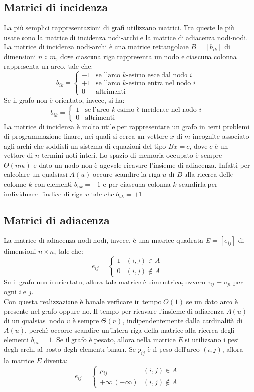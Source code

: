 \documentclass[12pt]{report}
\begin{document}
   	\subsection{Matrici di incidenza}
   	La più semplici rappresentazioni di grafi utilizzano matrici. Tra queste le più usate sono la matrice di incidenza nodi-archi e la matrice di adiacenza nodi-nodi. La matrice di incidenza nodi-archi è una matrice rettangolare $B = [b_{ik}]$ di dimensioni $n \times m$, dove ciascuna riga rappresenta un nodo e ciascuna colonna rappresenta un arco, tale che:
   	\[
   	b_{ik} = \begin{cases}
   		-1 & \text{se l'arco $k$-esimo esce dal nodo $i$} \\
   		+1 & \text{se l'arco $k$-esimo entra nel nodo $i$} \\
   		0 & \text{altrimenti}
   	\end{cases}
   	\]
   	Se il grafo non è orientato, invece, si ha:
   	\[
   	b_{ik} = \begin{cases}
   		1 & \text{se l'arco $k$-esimo è incidente nel nodo $i$} \\
   		0 & \text{altrimenti}
   	\end{cases}
   	\]
   	La matrice di incidenza è molto utile per rappresentare un grafo in certi problemi di programmazione linare, nei quali si cerca un vettore $x$ di $m$ incognite associato agli archi che soddisfi un sistema di equazioni del tipo $Bx = c$, dove $c$ è un vettore di $n$ termini noti interi. Lo spazio di memoria occupato è sempre $\Theta(nm)$ e dato un nodo non è agevole ricavare l'insieme di adiacenza. Infatti per calcolare un qualsiasi $A(u)$ occure scandire la riga $u$ di $B$ alla ricerca delle colonne $k$ con elementi $b_{uk} = -1$ e per ciascuna colonna $k$ scandirla per individuare l'indice di riga $v$ tale che $b_{vk} = +1$.
   	\subsection{Matrici di adiacenza}
   	La matrice di adiacenza nodi-nodi, invece, è una matrice quadrata $E = [e_{ij}]$ di dimensioni $n \times n$, tale che:
   	\[
   	e_{ij} = \begin{cases}
   		1 & (i, j) \in A \\
   		0 & (i, j) \notin A
   	\end{cases}
   	\]
   	Se il grafo non è orientato, allora tale matrice è simmetrica, ovvero $e_{ij} = e_{ji}$ per ogni $i$ e $j$. \\
   	Con questa realizzazione è banale verficare in tempo $O(1)$ se un dato arco è presente nel grafo oppure no. Il tempo per ricavare l'insieme di adiacenza $A(u)$ di un qualsiasi nodo $u$ è sempre $\Theta(n)$, indipendentemente dalla cardinalità di $A(u)$, perchè occorre scandire un'intera riga della matrice alla ricerca degli elementi $b_{uv} = 1$. Se il grafo è pesato, allora nella matrice $E$ si utilizzano i pesi degli archi al posto degli elementi binari. Se $p_{ij}$ è il peso dell'arco $(i, j)$, allora la matrice $E$ diventa:
   	\[
   	e_{ij} = \begin{cases}
   		p_{ij} & (i, j) \in A\\
   		+\infty\ (-\infty) & (i, j) \notin A
   	\end{cases}
   	\]
\end{document}
